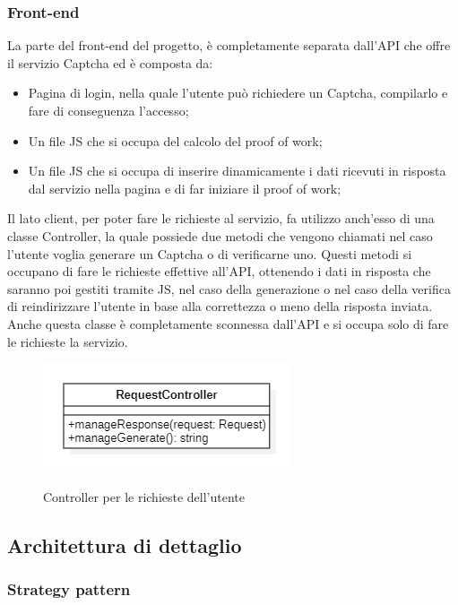 \subsubsection{Front-end}
La parte del front-end del progetto, è completamente separata dall'API che offre il servizio Captcha ed è composta da:
\begin{itemize}
	\item Pagina di login, nella quale l'utente può richiedere un Captcha, 
    compilarlo e fare di conseguenza l'accesso;
    \item Un file JS che si occupa del calcolo del proof of work;
    \item Un file JS che si occupa di inserire dinamicamente i dati ricevuti in risposta dal servizio nella pagina e di far iniziare il proof of work;
\end{itemize}
Il lato client, per poter fare le richieste al servizio, fa utilizzo anch'esso di una classe Controller, la quale possiede due metodi che vengono chiamati nel caso l'utente voglia generare un Captcha o di verificarne uno. Questi metodi si occupano di fare le richieste effettive all'API, ottenendo i dati in risposta che saranno poi gestiti tramite JS, nel caso della generazione o nel caso della verifica di reindirizzare l'utente in base alla correttezza o meno della risposta inviata.
Anche questa classe è completamente sconnessa dall'API e si occupa solo di fare le richieste la servizio. 

\begin{figure}[H]
	\centering
	\includegraphics[scale = 0.8]{img/request_controller.png}\\
	\caption{Controller per le richieste dell'utente}
\end{figure}

\subsection{Architettura di dettaglio}

\subsubsection{Strategy pattern}

